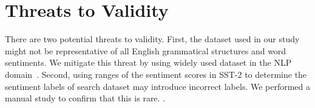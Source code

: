 \section{Threats to Validity}
\label{sec:threats}

There are two potential threats to validity.
First, the dataset
used in our study might not be representative of all
English grammatical structures and word sentiments. We
mitigate this threat by using widely used dataset in the NLP
domain~\cite{husnain2021swnvalidity}.
Second, using ranges of the sentiment scores in SST-2 to determine the sentiment labels of search dataset may introduce incorrect labels. We performed a manual study to confirm that this is rare. 
\cite{mitchell1993treebank, nltkTreebankCorporaWebPage}. 

